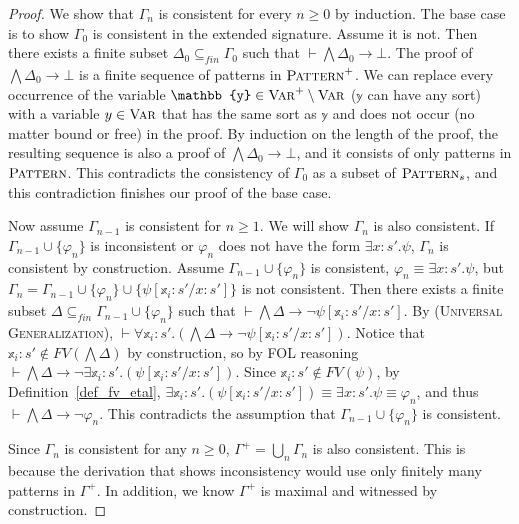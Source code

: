 \documentclass[acmsmall]{acmart}
\theoremstyle{acmdefinition}
\newcommand{\imp}{\to}
\newcommand{\Var}{\textnormal{\textsc{Var}}}
\newcommand{\Pattern}{\textnormal{\textsc{Pattern}}}
\newcommand{\eVar}{\Var^+}
\newcommand{\ePattern}{\Pattern^+}
\newcommand{\newVar}{\eVar \setminus \Var}
\newcommand{\newvar}[1]{\mathbb{#1}}
\newcommand{\newx}{\newvar{x}}
\newcommand{\newy}{\newvar{y}}
\newcommand{\eGamma}{\Gamma^+}
\newcommand{\prule}[1]{\textsc{(#1)}}
\newcommand{\universalgeneralization}{\prule{Universal Generalization}\xspace}
\newcommand{\fv}{\mathit{FV}}
\newcommand{\FV}{\fv}
\newcommand{\cln}{{:}}
\newcommand{\fin}{\mathit{fin}}
\begin{document}
\begin{proof}
We show that $\Gamma_n$ is consistent
for every $n \ge 0$ by induction.
The base case is to show
$\Gamma_0$ is consistent in the extended signature.
Assume it is not.
Then there exists a finite subset
$\Delta_0 \subseteq_\fin \Gamma_0$ such that
$\vdash \bigwedge \Delta_0 \imp \bot$.
The proof of $\bigwedge \Delta_0 \imp \bot$
is a finite sequence of patterns in $\ePattern$.
We can replace every occurrence of the variable $\newy \in \newVar$
($\newy$ can have any sort)
with a variable $y \in \Var$ that 
has the same sort as $\newy$ and
does not occur
(no matter bound or free)
in the proof.
By induction on the length of the proof,
the resulting sequence is also a proof of
$\bigwedge \Delta_0 \imp \bot$,
and it consists of only patterns in $\Pattern$.
This contradicts the consistency of $\Gamma_0$
as a subset of $\Pattern_s$,
and this contradiction finishes our proof of the base case.

Now assume $\Gamma_{n-1}$ is consistent for $n \ge 1$.
We will show $\Gamma_n$ is also consistent.
If $\Gamma_{n-1} \cup \{ \varphi_n \}$ is inconsistent
or $\varphi_n$ does not have the form $\exists x \cln s' . \psi$,
$\Gamma_n$ is consistent by construction.
Assume $\Gamma_{n-1} \cup \{ \varphi_n \}$ is consistent,
$\varphi_n \equiv \exists x \cln s' . \psi$,
but
$\Gamma_n = 
 \Gamma_{n-1} 
 \cup \{ \varphi_n \} 
 \cup \{ \psi[\newx_i \cln s' /x \cln s'] \}$
is not consistent.
Then there exists a finite subset 
$\Delta \subseteq_\fin \Gamma_{n-1} \cup \{\varphi_n\}$
such that 
$\vdash \bigwedge \Delta \imp \neg \psi[\newx_i \cln s' /x \cln s']$.
By \universalgeneralization,
$\vdash 
 \forall \newx_i \cln s'. 
 (\bigwedge \Delta \imp \neg \psi[\newx_i \cln s' /x \cln s'])$.
Notice that $\newx_i \cln s' \not\in \FV(\bigwedge \Delta)$
by construction,
so by FOL reasoning
$\vdash 
 \bigwedge \Delta 
 \imp \neg \exists \newx_i \cln s' . (\psi[\newx_i\cln s' /x\cln s' ])$.
Since $\newx_i \cln s' \not\in \FV(\psi)$,
by Definition~\ref{def_fv_etal},
$\exists \newx_i \cln s' . (\psi[\newx_i\cln s' /x\cln s' ]) \equiv \exists x 
\cln s' . \psi \equiv \varphi_n$, 
and thus $\vdash \bigwedge \Delta \imp \neg \varphi_n$.
This contradicts the assumption
that $\Gamma_{n-1} \cup \{\varphi_n\}$ is consistent.

Since $\Gamma_n$ is consistent for any $n \ge 0$, 
$\eGamma = \bigcup_n \Gamma_n$
is also consistent.
This is because the derivation 
that shows inconsistency would use only finitely many
patterns in $\eGamma$.
In addition, we know $\eGamma$ is maximal and witnessed by construction.
\end{proof}
\end{document}
